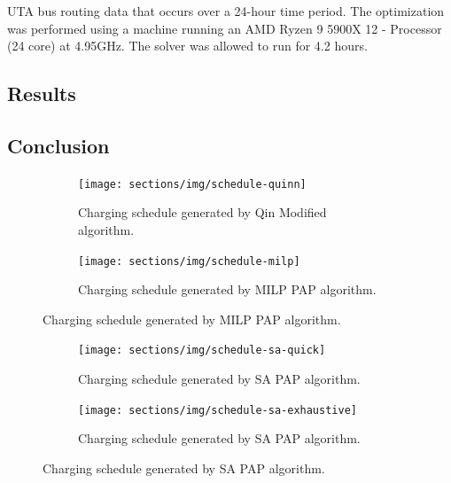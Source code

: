 \documentclass[11pt,a4paper,final]{article}
\newcommand{\timeran}{4.2 }                                                    %
\begin{document}
UTA bus routing data that occurs over a 24-hour time period. The optimization was performed using a machine running an
AMD Ryzen 9 5900X 12 - Processor (24 core) at 4.95GHz. The solver was allowed to run for \timeran hours.

\subsection{Results}
\label{results}

\subsection{Conclusion}
\label{conclusion}
\begin{figure}
  \centering
  \begin{subfigure}[t]{\textwidth}
    \centering
    \texttt{[image: sections/img/schedule-quinn]}
    \caption{Charging schedule generated by Qin Modified algorithm.}
    \label{subfig:schedule-quinn}
  \end{subfigure}

  \hfill

  \begin{subfigure}[t]{\textwidth}
    \centering
    \texttt{[image: sections/img/schedule-milp]}
    \caption{Charging schedule generated by MILP PAP algorithm.}
    \label{subfig:schedule-milp}
  \end{subfigure}
\end{figure}

\begin{figure} \ContinuedFloat
  \centering
  \begin{subfigure}[t]{\textwidth}
    \centering \texttt{[image: sections/img/schedule-sa-quick]}
    \caption{Charging schedule generated by SA PAP algorithm.}
    \label{subfig:schedule-quick-sa}
  \end{subfigure}

  \hfill

  \begin{subfigure}[t]{\textwidth}
    \centering \texttt{[image: sections/img/schedule-sa-exhaustive]}
    \caption{Charging schedule generated by SA PAP algorithm.}
    \label{subfig:schedule-exhaustive-sa}
  \end{subfigure}
\end{figure}
\end{document}
